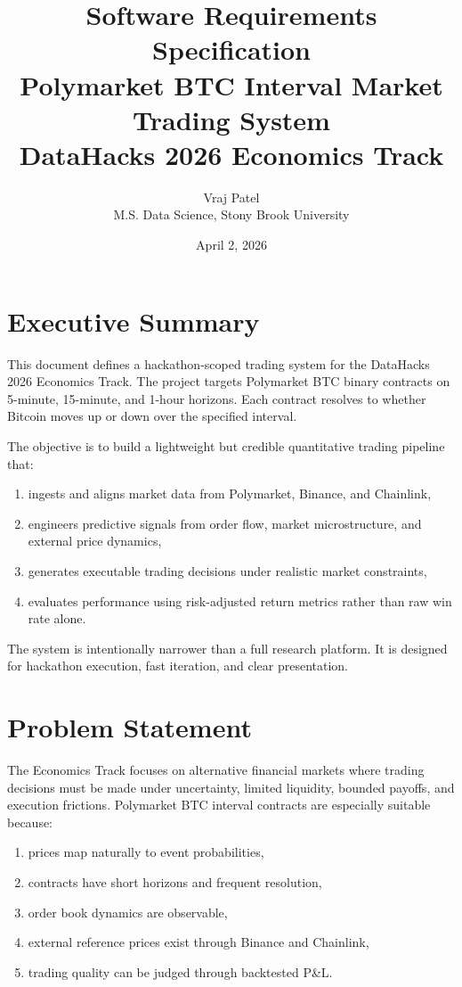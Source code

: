 \documentclass[11pt, letterpaper]{article}
\title{
    \textbf{Software Requirements Specification} \\[0.4em]
    \Large Polymarket BTC Interval Market Trading System \\[0.2em]
    \large DataHacks 2026 Economics Track
}
\author{
    Vraj Patel \\
    M.S. Data Science, Stony Brook University
}
\date{April 2, 2026}
\begin{document}
\maketitle
\tableofcontents
\newpage

\section{Executive Summary}

This document defines a hackathon-scoped trading system for the DataHacks 2026 Economics Track. The project targets Polymarket BTC binary contracts on 5-minute, 15-minute, and 1-hour horizons. Each contract resolves to whether Bitcoin moves up or down over the specified interval.

The objective is to build a lightweight but credible quantitative trading pipeline that:

\begin{enumerate}[nosep]
    \item ingests and aligns market data from Polymarket, Binance, and Chainlink,
    \item engineers predictive signals from order flow, market microstructure, and external price dynamics,
    \item generates executable trading decisions under realistic market constraints,
    \item evaluates performance using risk-adjusted return metrics rather than raw win rate alone.
\end{enumerate}

The system is intentionally narrower than a full research platform. It is designed for hackathon execution, fast iteration, and clear presentation.

\section{Problem Statement}

The Economics Track focuses on alternative financial markets where trading decisions must be made under uncertainty, limited liquidity, bounded payoffs, and execution frictions. Polymarket BTC interval contracts are especially suitable because:

\begin{enumerate}[nosep]
    \item prices map naturally to event probabilities,
    \item contracts have short horizons and frequent resolution,
    \item order book dynamics are observable,
    \item external reference prices exist through Binance and Chainlink,
    \item trading quality can be judged through backtested P\&L.
\end{enumerate}
\end{document}
